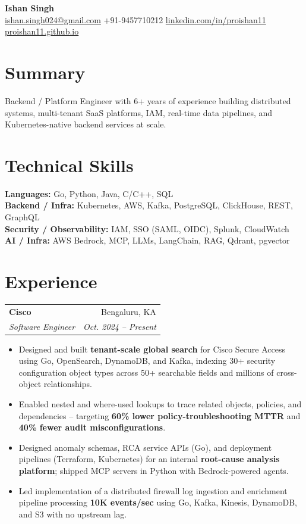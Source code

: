 \documentclass[letterpaper,10pt]{article}
\makeatletter
\newenvironment{resumeList}{
  \begin{itemize}[
    leftmargin=0.22in,
    label=\textbullet,
    itemsep=2pt,
    topsep=2.5pt,
    parsep=0pt,
    partopsep=0pt
  ]
}{
  \end{itemize}
  \vspace{0pt}
}
\newcommand{\resumeSubheading}[4]{
  \vspace{3pt}
  \begin{tabular*}{\textwidth}{l@{\extracolsep{\fill}}r}
    \textbf{#1} & #2 \\
    \textit{#3} & \textit{#4} \\
  \end{tabular*}
  \vspace{-5pt}
}
\makeatother
\begin{document}
\begin{center}
  {\LARGE \textbf{Ishan Singh}} \\[1pt]
  \href{mailto:ishan.singh024@gmail.com}{ishan.singh024@gmail.com}
  \textbar{} +91-9457710212
  \textbar{} \href{https://linkedin.com/in/proishan11}{linkedin.com/in/proishan11}
  \textbar{} \href{https://proishan11.github.io}{proishan11.github.io}
\end{center}

\vspace{-8pt}

\section{Summary}
Backend / Platform Engineer with 6+ years of experience building distributed systems, multi-tenant SaaS platforms, IAM, real-time data pipelines, and Kubernetes-native backend services at scale.

\section{Technical Skills}
\textbf{Languages:} Go, Python, Java, C/C++, SQL \\
\textbf{Backend / Infra:} Kubernetes, AWS, Kafka, PostgreSQL, ClickHouse, REST, GraphQL \\
\textbf{Security / Observability:} IAM, SSO (SAML, OIDC), Splunk, CloudWatch \\
\textbf{AI / Infra:} AWS Bedrock, MCP, LLMs, LangChain, RAG, Qdrant, pgvector

\section{Experience}

\resumeSubheading
  {Cisco}{Bengaluru, KA}
  {Software Engineer}{Oct. 2024 -- Present}
\begin{resumeList}
  \item Designed and built \textbf{tenant-scale global search} for Cisco Secure Access using Go, OpenSearch, DynamoDB, and Kafka, indexing 30+ security configuration object types across 50+ searchable fields and millions of cross-object relationships.
  \item Enabled nested and where-used lookups to trace related objects, policies, and dependencies -- targeting \textbf{60\% lower policy-troubleshooting MTTR} and \textbf{40\% fewer audit misconfigurations}.
  \item Designed anomaly schemas, RCA service APIs (Go), and deployment pipelines (Terraform, Kubernetes) for an internal \textbf{root-cause analysis platform}; shipped MCP servers in Python with Bedrock-powered agents.
  \item Led implementation of a distributed firewall log ingestion and enrichment pipeline processing \textbf{10K events/sec} using Go, Kafka, Kinesis, DynamoDB, and S3 with no upstream lag.
\end{resumeList}
\end{document}
